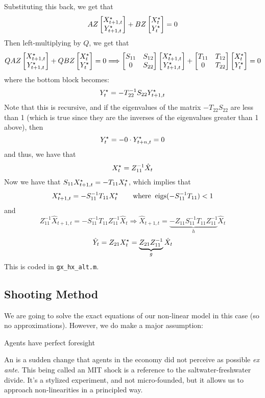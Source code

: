 \documentclass[10pt]{article}
\begin{document}
Substituting this back, we get that
\[
AZ \begin{bmatrix}X_{t+1,t}^\star \\ Y^\star_{t+1,t}\end{bmatrix} + BZ \begin{bmatrix}X_{t}^\star \\ Y^\star_{t}\end{bmatrix} = 0
\]
Then left-multiplying by $Q$, we get that
\[
QAZ \begin{bmatrix}X_{t+1,t}^\star \\ Y^\star_{t+1,t}\end{bmatrix} + QBZ \begin{bmatrix}X_{t}^\star \\ Y^\star_{t}\end{bmatrix} = 0 \Longrightarrow \begin{bmatrix}S_{11} & S_{12} \\ 0 & S_{22}\end{bmatrix} \begin{bmatrix}X_{t+1,t}^\star \\ Y^\star_{t+1,t}\end{bmatrix} + \begin{bmatrix}T_{11} & T_{12} \\ 0 & T_{22}\end{bmatrix} \begin{bmatrix}X_{t}^\star \\ Y^\star_{t}\end{bmatrix} = 0
\]
where the bottom block becomes:
\[
Y_t^\star = -T_{22}^{-1} S_{22} Y^\star_{t+1,t} 
\]
Note that this is recursive, and if the eigenvalues of the matrix $-T_{22}S_{22}$ are less than 1 (which is true since they are the inverses of the eigenvalues greater than 1 above), then
\[
Y_t^\star = - 0 \cdot Y^\star_{t+n,t} = 0
\]
and thus, we have that
\[
X_t^\star = Z_{11}^{-1} \hat{X}_t
\]
Now we have that $S_{11} X^\star_{t+1,t} = -T_{11} X^\star_t$, which implies that
\[
X^\star_{t+1,t} = -S_{11}^{-1} T_{11} X^\star_t \qquad \text{where}\;\; \text{eigs}(-S_{11}^{-1} T_{11}) < 1
\]
and
\[
Z_{11}^{-1} \hat{X}_{t+1,t} = -S_{11}^{-1} T_{11} Z_{11}^{-1} \hat{X}_t \Longrightarrow \hat{X}_{t+1,t} = \underbrace{-Z_{11}S_{11}^{-1}T_{11}Z_{11}^{-1} }_{h} \hat{X}_t
\]
\[
\hat{Y}_t = Z_{21} X^\star_t = \underbrace{Z_{21}Z_{11}^{-1}}_{g} \hat{X}_t
\]
This is coded in \texttt{gx\_hx\_alt.m}.


\subsection{Shooting Method}

\begin{remark}
	We are going to solve the exact equations of our non-linear model in this case (so no approximations). However, we do make a major assumption:
\end{remark}
\begin{assumption}
	Agents have perfect foresight
\end{assumption}

\begin{definition}
	An  is a sudden change that agents in the economy did not perceive as possible \emph{ex ante}. This being called an MIT shock is a reference to the saltwater-freshwater divide. It's a stylized experiment, and not micro-founded, but it allows us to approach non-linearities in a principled way.
\end{definition}
\end{document}
